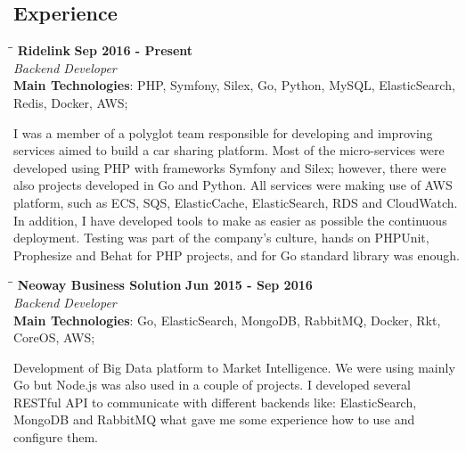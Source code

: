 \documentclass[margin]{res}
\begin{document}
\begin{resume}
\section{Experience}
\vspace{-0.1in}
    \begin{tabbing}
    \hspace{2.3in}\= \hspace{1.7in}\= \kill %
    \textbf{Ridelink}    \>\>\textbf{Sep 2016 - Present}\\
    \textit{Backend Developer}\\
    \textbf{Main Technologies}: PHP, Symfony, Silex, Go, Python, MySQL, ElasticSearch, \\Redis, Docker, AWS;
    \end{tabbing}\vspace{-20pt}      %
    \vspace{2mm}
I was a member of a polyglot team responsible for developing and improving services aimed to build a car sharing platform. Most of the micro-services were developed using PHP with frameworks Symfony and Silex; however, there were also projects developed in Go and Python. All services were making use of AWS platform, such as ECS, SQS, ElasticCache, ElasticSearch, RDS and CloudWatch. In addition, I have developed tools to make as easier as possible the continuous deployment. Testing was part of the company’s culture, hands on PHPUnit, Prophesize and Behat for PHP projects, and for Go standard library was enough.

\vspace{-0.1in}
    \begin{tabbing}
    \hspace{2.3in}\= \hspace{1.7in}\= \kill %
    \textbf{Neoway Business Solution}    \>\>\textbf{Jun 2015 - Sep 2016}\\
    \textit{Backend Developer}\\
    \textbf{Main Technologies}: Go, ElasticSearch, MongoDB, RabbitMQ, Docker, Rkt,\\CoreOS, AWS;
    \end{tabbing}\vspace{-20pt}      %
    \vspace{2mm}
Development of Big Data platform to Market Intelligence. We were using mainly Go but Node.js was also used in a couple of projects. I developed several RESTful API to communicate with different backends like: ElasticSearch, MongoDB and RabbitMQ what gave me some experience how to use and configure them.


\end{resume}
\end{document}

